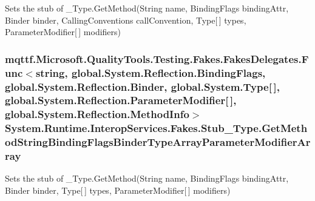 Sets the stub of \-\_\-\-Type.\-Get\-Method(\-String name, Binding\-Flags binding\-Attr, Binder binder, Calling\-Conventions call\-Convention, Type\mbox{[}$\,$\mbox{]} types, Parameter\-Modifier\mbox{[}$\,$\mbox{]} modifiers)

\hypertarget{class_system_1_1_runtime_1_1_interop_services_1_1_fakes_1_1_stub___type_ad39a9b201a57334fbc2093177cff2126}{
\subsubsection[{Get\-Method\-String\-Binding\-Flags\-Binder\-Type\-Array\-Parameter\-Modifier\-Array}]{\setlength{\rightskip}{0pt plus 5cm}mqttf.\-Microsoft.\-Quality\-Tools.\-Testing.\-Fakes.\-Fakes\-Delegates.\-Func$<$string, global.\-System.\-Reflection.\-Binding\-Flags, global.\-System.\-Reflection.\-Binder, global.\-System.\-Type\mbox{[}$\,$\mbox{]}, global.\-System.\-Reflection.\-Parameter\-Modifier\mbox{[}$\,$\mbox{]}, global.\-System.\-Reflection.\-Method\-Info$>$ System.\-Runtime.\-Interop\-Services.\-Fakes.\-Stub\-\_\-\-Type.\-Get\-Method\-String\-Binding\-Flags\-Binder\-Type\-Array\-Parameter\-Modifier\-Array}}\label{class_system_1_1_runtime_1_1_interop_services_1_1_fakes_1_1_stub___type_ad39a9b201a57334fbc2093177cff2126}


Sets the stub of \-\_\-\-Type.\-Get\-Method(\-String name, Binding\-Flags binding\-Attr, Binder binder, Type\mbox{[}$\,$\mbox{]} types, Parameter\-Modifier\mbox{[}$\,$\mbox{]} modifiers)

